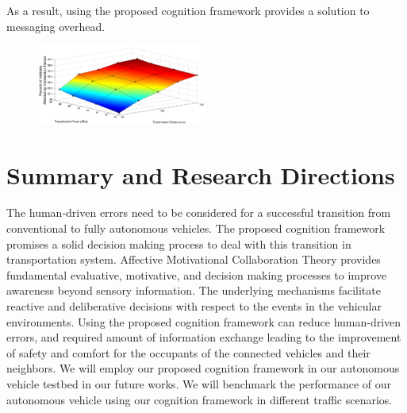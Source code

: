 \documentclass[journal, 11pt]{IEEEtran}
\begin{document}
As a result, using the proposed cognition framework provides a
solution to messaging overhead.

\begin{figure}[tbh]
  \centering
  \includegraphics[width=0.5\textwidth]{figs/urban3d.png}
  \caption{{\fontsize{10}{10}}}
  \label{fig:urban3d}
\end{figure}

\section{Summary and Research Directions}
\label{Sec:Conc}

The human-driven errors need to be considered for a successful transition from
conventional to fully autonomous vehicles. The proposed cognition framework
promises a solid decision making process to deal with this transition in
transportation system. Affective Motivational Collaboration Theory provides
fundamental evaluative, motivative, and decision making processes to improve
awareness beyond sensory information. The underlying mechanisms facilitate
reactive and deliberative decisions with respect to the events in the vehicular
environments. Using the proposed cognition framework can reduce human-driven
errors, and required amount of information exchange leading to the improvement
of safety and comfort for the occupants of the connected vehicles and their
neighbors. We will employ our proposed cognition framework in our autonomous
vehicle testbed in our future works. We will benchmark the performance of our
autonomous vehicle using our cognition framework in different traffic scenarios.



% 
\end{document}
